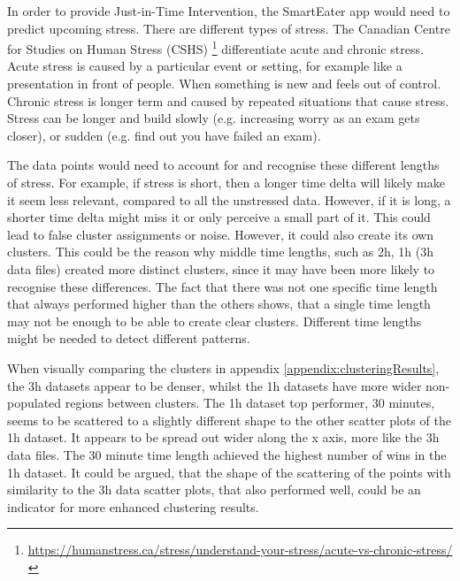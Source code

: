 In order to provide Just-in-Time Intervention, the SmartEater app would need to predict upcoming stress. There are different types of stress. The Canadian Centre for Studies on Human Stress (CSHS) \footnote{\url{https://humanstress.ca/stress/understand-your-stress/acute-vs-chronic-stress/}} differentiate acute and chronic stress. Acute stress is caused by a particular event or setting, for example like a presentation in front of people. When something is new and feels out of control. Chronic stress is longer term and caused by repeated situations that cause stress. Stress can be longer and build slowly (e.g. increasing worry as an exam gets closer), or sudden (e.g. find out you have failed an exam). 

The data points would need to account for and recognise these different lengths of stress. For example, if stress is short, then a longer time delta will likely make it seem less relevant, compared to all the unstressed data. However, if it is long, a shorter time delta might miss it or only perceive a small part of it. This could lead to false cluster assignments or noise. However, it could also create its own clusters. This could be the reason why middle time lengths, such as 2h, 1h (3h data files) created more distinct clusters, since it may have been more likely to recognise these differences. The fact that there was not one specific time length that always performed higher than the others shows, that a single time length may not be enough to be able to create clear clusters. Different time lengths might be needed to detect different patterns.

When visually comparing the clusters in appendix \ref{appendix:clusteringResults}, the 3h datasets appear to be denser, whilst the 1h datasets have more wider non-populated regions between clusters. The 1h dataset top performer, 30 minutes, seems to be scattered to a slightly different shape to the other scatter plots of the 1h dataset. It appears to be spread out wider along the x axis, more like the 3h data files. The 30 minute time length achieved the highest number of wins in the 1h dataset. It could be argued, that the shape of the scattering of the points with similarity to the 3h data scatter plots, that also performed well, could be an indicator for more enhanced clustering results.



